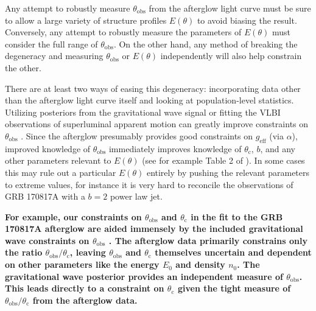 \documentclass[twocolumn]{aastex62}
\newcommand{\grbbns}{GRB 170817A}
\newcommand{\thobs}{\ensuremath{\theta_{\mathrm{obs}}}}
\newcommand{\thC}{\ensuremath{\theta_{\mathrm{c}}}}
\newcommand{\geff}{\ensuremath{g_{\mathrm{eff}}}}
\begin{document}
Any attempt to robustly measure $\thobs$ from the afterglow light curve must be sure to allow a large variety of structure profiles $E(\theta)$ to avoid biasing the result. Conversely, any attempt to robustly measure the parameters of $E(\theta)$ must consider the full range of $\thobs$. On the other hand, any method of breaking the degeneracy and measuring $\thobs$ or $E(\theta)$ independently will also help constrain the other.

There are at least two ways of easing this degeneracy: incorporating data other than the afterglow light curve itself and looking at population-level statistics.  Utilizing posteriors from the gravitational wave signal or fitting the VLBI observations of superluminal apparent motion can greatly improve constraints on $\thobs$ \citep{Troja:2018aa, Hotokezaka:2018aa, Ghirlanda:2019aa}.  Since the afterglow presumably provides good constraints on $\geff$ (via $\alpha$), improved knowledge of $\thobs$ immediately improves knowledge of $\thC$, $b$, and any other parameters relevant to $E(\theta)$ (see for example Table 2 of \citet{Troja:2018aa}).  In some cases this may rule out a particular $E(\theta)$ entirely by pushing the relevant parameters to extreme values, for instance it is very hard to reconcile the observations of \grbbns{} with a $b=2$ power law jet.

{\bf For example, our constraints on $\thobs$ and $\thC$ in the fit to the \grbbns{} afterglow are aided immensely by the included gravitational wave constraints on $\thobs$ \citep{Abbott:2017aa}. The afterglow data primarily constrains only the ratio $\thobs/\thC$, leaving $\thobs$ and $\thC$ themselves uncertain and dependent on other parameters like the energy $E_0$ and density $n_0$.  The gravitational wave posterior provides an independent measure of $\thobs$. This leads directly to a constraint on $\thC$ given the tight measure of $\thobs/\thC$ from the afterglow data. }
\end{document}
